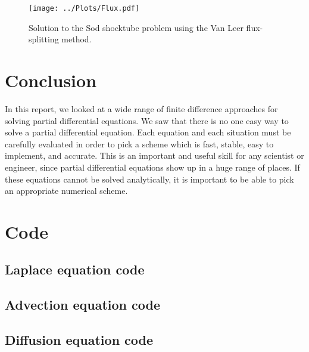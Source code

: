 \documentclass[twocolumn]{myarticle}
\begin{document}
\begin{figure}[ht]
    \centering
    \texttt{[image: ../Plots/Flux.pdf]}
    \caption{Solution to the Sod shocktube problem using the Van Leer flux-splitting method.}
    \label{fig:flux_shock}
\end{figure}

\section{Conclusion}
\label{sec:conclusion}

In this report, we looked at a wide range of finite difference approaches for solving partial differential equations.
We saw that there is no one easy way to solve a partial differential equation.
Each equation and each situation must be carefully evaluated in order to pick a scheme which is fast, stable, easy to implement, and accurate.
This is an important and useful skill for any scientist or engineer, since partial differential equations show up in a huge range of places.
If these equations cannot be solved analytically, it is important to be able to pick an appropriate numerical scheme.

\onecolumn



\section{Code}
\label{sec:code}

\subsection{Laplace equation code}
\label{subsec:laplace_equation_code}


\vspace{10pt}

\subsection{Advection equation code}
\label{subsec:advection_equation_code}


\vspace{10pt}

\subsection{Diffusion equation code}
\label{subsec:diffusion_equation_code}
\end{document}
